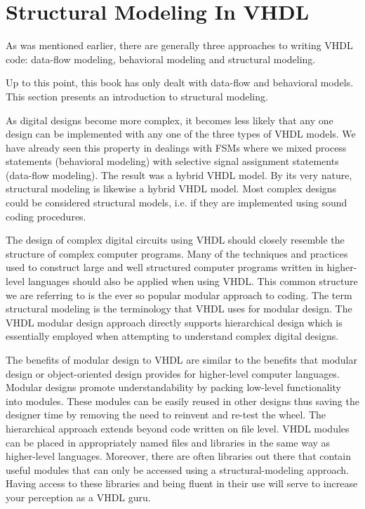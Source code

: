 %
%
\chapter{Structural Modeling In VHDL}
As was mentioned earlier, there are generally three approaches to writing VHDL code: data-flow modeling, behavioral modeling and structural modeling.

Up to this point, this book has only dealt with data-flow and behavioral models. This section presents an introduction to structural modeling.

As digital designs become more complex, it becomes less likely that any one design can be implemented with any one of the three types of VHDL models. We have already seen this property in dealings with FSMs where we mixed process statements (behavioral modeling) with selective signal assignment statements (data-flow modeling). The result was a hybrid VHDL model. By its very nature, structural modeling is likewise a hybrid VHDL model. Most complex designs could be considered structural models, i.e. if they are implemented using sound coding procedures.

The design of complex digital circuits using VHDL should closely resemble the structure of complex computer programs. Many of the techniques and practices used to construct large and well structured computer programs written in higher-level languages should also be applied when using VHDL. This common structure we are referring to is the ever so popular modular approach to coding. The term structural modeling is the terminology that VHDL uses for modular design. The VHDL modular design approach directly supports hierarchical design which is essentially employed when attempting to understand complex digital designs.

The benefits of modular design to VHDL are similar to the benefits that modular design or object-oriented design provides for higher-level computer languages. Modular designs promote understandability by packing low-level functionality into modules. These modules can be easily reused in other designs thus saving the designer time by removing the need to reinvent and re-test the wheel. The hierarchical approach extends beyond code written on file level. VHDL modules can be placed in appropriately named files and libraries in the same way as higher-level languages. Moreover, there are often libraries out there that contain useful modules that can only be accessed using a structural-modeling approach. Having access to these libraries and being fluent in their use will serve to increase your perception as a VHDL guru.

